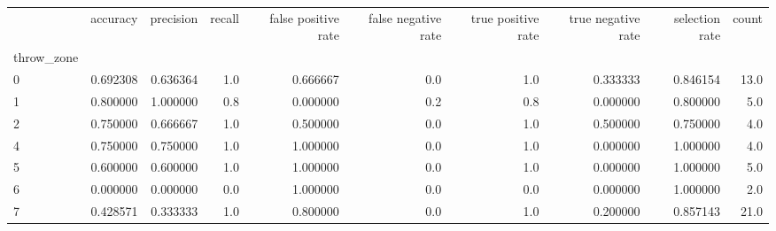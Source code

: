 \begin{tabular}{lrrrrrrrrr}
\toprule
{} &  accuracy &  precision &  recall &  false positive rate &  false negative rate &  true positive rate &  true negative rate &  selection rate &  count \\
throw\_zone &           &            &         &                      &                      &                     &                     &                 &        \\
\midrule
0          &  0.692308 &   0.636364 &     1.0 &             0.666667 &                  0.0 &                 1.0 &            0.333333 &        0.846154 &   13.0 \\
1          &  0.800000 &   1.000000 &     0.8 &             0.000000 &                  0.2 &                 0.8 &            0.000000 &        0.800000 &    5.0 \\
2          &  0.750000 &   0.666667 &     1.0 &             0.500000 &                  0.0 &                 1.0 &            0.500000 &        0.750000 &    4.0 \\
4          &  0.750000 &   0.750000 &     1.0 &             1.000000 &                  0.0 &                 1.0 &            0.000000 &        1.000000 &    4.0 \\
5          &  0.600000 &   0.600000 &     1.0 &             1.000000 &                  0.0 &                 1.0 &            0.000000 &        1.000000 &    5.0 \\
6          &  0.000000 &   0.000000 &     0.0 &             1.000000 &                  0.0 &                 0.0 &            0.000000 &        1.000000 &    2.0 \\
7          &  0.428571 &   0.333333 &     1.0 &             0.800000 &                  0.0 &                 1.0 &            0.200000 &        0.857143 &   21.0 \\
\bottomrule
\end{tabular}
